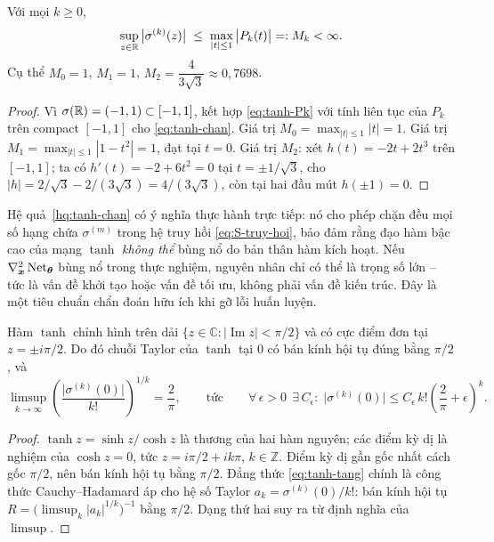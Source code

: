 \begin{hequa}
\label{hq:tanh-chan}
Với mọi $k \ge 0$,
\begin{equation}
\sup_{z\in\mathbb{R}} \big|\sigma^{(k)}(z)\big|
 \;\le\; \max_{|t| \le 1} \big|P_k(t)\big| =: M_k < \infty .
\label{eq:tanh-chan}
\end{equation}
Cụ thể $M_0 = 1$, $M_1 = 1$, $M_2 = \dfrac{4}{3\sqrt{3}} \approx 0{,}7698$.
\end{hequa}
 
\begin{proof}
Vì $\sigma(\mathbb{R}) = (-1,1) \subset [-1,1]$, kết hợp \eqref{eq:tanh-Pk} với tính
liên tục của $P_k$ trên compact $[-1,1]$ cho \eqref{eq:tanh-chan}. Giá trị
$M_0 = \max_{|t|\le1}|t| = 1$. Giá trị $M_1 = \max_{|t|\le1}|1-t^2| = 1$, đạt
tại $t = 0$. Giá trị $M_2$: xét $h(t) = -2t + 2t^3$ trên $[-1,1]$; ta có
$h'(t) = -2 + 6t^2 = 0$ tại $t = \pm 1/\sqrt3$, cho
$|h| = 2/\sqrt3 - 2/(3\sqrt3) = 4/(3\sqrt3)$, còn tại hai đầu mút $h(\pm1) = 0$.
\end{proof}
 
Hệ quả~\ref{hq:tanh-chan} có ý nghĩa thực hành trực tiếp: nó cho phép chặn đều
mọi số hạng chứa $\sigma^{(m)}$ trong hệ truy hồi \eqref{eq:S-truy-hoi}, bảo đảm
rằng đạo hàm bậc cao của mạng $\tanh$ \emph{không thể} bùng nổ do bản thân hàm
kích hoạt. Nếu $\nabla^2_{\bm{x}}\operatorname{Net}_{\bm{\theta}}$ bùng nổ trong thực nghiệm, nguyên
nhân chỉ có thể là trọng số lớn -- tức là vấn đề khởi tạo hoặc vấn đề tối ưu,
không phải vấn đề kiến trúc. Đây là một tiêu chuẩn chẩn đoán hữu ích khi gỡ lỗi
huấn luyện.
 
\begin{menhde}
\label{md:tanh-giai-tich}
Hàm $\tanh$ chỉnh hình trên dải
$\{z \in \mathbb{C} : |\operatorname{Im} z| < \pi/2\}$ và có cực điểm đơn tại
$z = \pm i\pi/2$. Do đó chuỗi Taylor của $\tanh$ tại $0$ có bán kính hội tụ đúng
bằng $\pi/2$, và
\begin{equation}
\limsup_{k\to\infty}
  \left(\frac{\big|\sigma^{(k)}(0)\big|}{k!}\right)^{\!1/k}
 = \frac{2}{\pi},
\qquad\text{tức}\qquad
\forall\,\epsilon>0\ \ \exists\, C_\epsilon:\;
\big|\sigma^{(k)}(0)\big| \le C_\epsilon\, k!
  \left(\frac{2}{\pi}+\epsilon\right)^{\!k} .
\label{eq:tanh-tang}
\end{equation}
\end{menhde}
 
\begin{proof}
$\tanh z = \sinh z/\cosh z$ là thương của hai hàm nguyên; các điểm kỳ dị là
nghiệm của $\cosh z = 0$, tức $z = i\pi/2 + ik\pi$, $k \in \mathbb{Z}$. Điểm kỳ
dị gần gốc nhất cách gốc $\pi/2$, nên bán kính hội tụ bằng $\pi/2$. Đẳng thức
\eqref{eq:tanh-tang} chính là công thức Cauchy--Hadamard áp cho hệ số Taylor
$a_k = \sigma^{(k)}(0)/k!$: bán kính hội tụ $R = \big(\limsup_k
|a_k|^{1/k}\big)^{-1}$ bằng $\pi/2$. Dạng thứ hai suy ra từ định nghĩa của
$\limsup$.
\end{proof}
 
